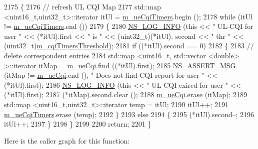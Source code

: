\begin{DoxyCode}
2175 \{
2176   \textcolor{comment}{// refresh UL CQI  Map}
2177   std::map <uint16\_t,uint32\_t>::iterator itUl = \hyperlink{classns3_1_1PfFfMacScheduler_abe22b494875155dfe6a503734ad4bbad}{m\_ueCqiTimers}.begin ();
2178   \textcolor{keywordflow}{while} (itUl != \hyperlink{classns3_1_1PfFfMacScheduler_abe22b494875155dfe6a503734ad4bbad}{m\_ueCqiTimers}.end ())
2179     \{
2180       \hyperlink{group__logging_gafbd73ee2cf9f26b319f49086d8e860fb}{NS\_LOG\_INFO} (\textcolor{keyword}{this} << \textcolor{stringliteral}{" UL-CQI for user "} << (*itUl).first << \textcolor{stringliteral}{" is "} << (uint32\_t)(*itUl).
      second << \textcolor{stringliteral}{" thr "} << (uint32\_t)\hyperlink{classns3_1_1PfFfMacScheduler_ad2377e8bcc02252e2f0d3ca0fc2895b9}{m\_cqiTimersThreshold});
2181       \textcolor{keywordflow}{if} ((*itUl).second == 0)
2182         \{
2183           \textcolor{comment}{// delete correspondent entries}
2184           std::map <uint16\_t, std::vector <double> >::iterator itMap = \hyperlink{classns3_1_1PfFfMacScheduler_acf67c0074356c705e8bd89bb49ddd5ad}{m\_ueCqi}.find ((*itUl).first);
2185           \hyperlink{assert_8h_aff5ece9066c74e681e74999856f08539}{NS\_ASSERT\_MSG} (itMap != \hyperlink{classns3_1_1PfFfMacScheduler_acf67c0074356c705e8bd89bb49ddd5ad}{m\_ueCqi}.end (), \textcolor{stringliteral}{" Does not find CQI report for user "}
       << (*itUl).first);
2186           \hyperlink{group__logging_gafbd73ee2cf9f26b319f49086d8e860fb}{NS\_LOG\_INFO} (\textcolor{keyword}{this} << \textcolor{stringliteral}{" UL-CQI exired for user "} << (*itUl).first);
2187           (*itMap).second.clear ();
2188           \hyperlink{classns3_1_1PfFfMacScheduler_acf67c0074356c705e8bd89bb49ddd5ad}{m\_ueCqi}.erase (itMap);
2189           std::map <uint16\_t,uint32\_t>::iterator temp = itUl;
2190           itUl++;
2191           \hyperlink{classns3_1_1PfFfMacScheduler_abe22b494875155dfe6a503734ad4bbad}{m\_ueCqiTimers}.erase (temp);
2192         \}
2193       \textcolor{keywordflow}{else}
2194         \{
2195           (*itUl).second--;
2196           itUl++;
2197         \}
2198     \}
2199 
2200   \textcolor{keywordflow}{return};
2201 \}
\end{DoxyCode}


Here is the caller graph for this function\+:


